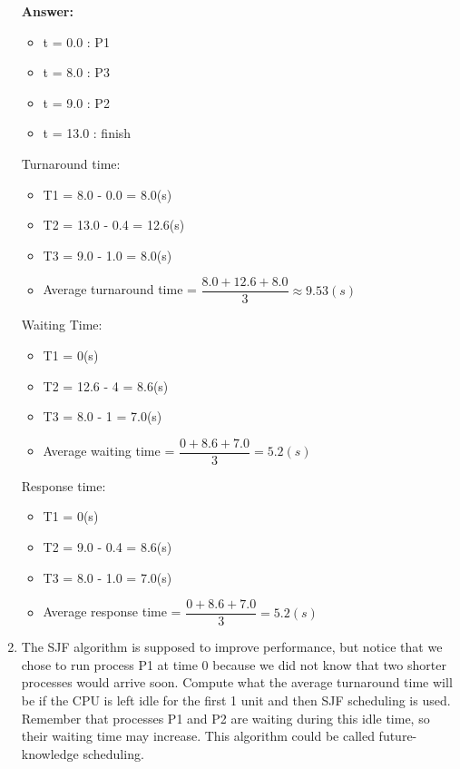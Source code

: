 \documentclass[a4paper]{article}
\newcommand{\tf}{\textbf}
\begin{document}
\begin{enumerate}[label=\alph*]
    \tf{Answer: } \\
    \begin{itemize}
        \item t = 0.0 : P1
        \item t = 8.0 : P3
        \item t = 9.0 : P2
        \item t = 13.0 : finish
    \end{itemize}

    \par{Turnaround time: } \\
    \begin{itemize}
        \item T1 = 8.0 - 0.0 = 8.0(s)
        \item T2 = 13.0 - 0.4 = 12.6(s)
        \item T3 = 9.0 - 1.0 = 8.0(s)
        \item Average turnaround time = $\dfrac{8.0 + 12.6 + 8.0}{3} \approx 9.53(s)$
    \end{itemize}

    \par{Waiting Time: } \\
    \begin{itemize}
        \item T1 = 0(s)
        \item T2 = 12.6 - 4 = 8.6(s)
        \item T3 = 8.0 - 1 = 7.0(s)
        \item Average waiting time = $\dfrac{0 + 8.6 + 7.0}{3} = 5.2(s)$
    \end{itemize}

    \par{Response time: }
    \begin{itemize}
        \item T1 = 0(s)
        \item T2 = 9.0 - 0.4 = 8.6(s)
        \item T3 = 8.0 - 1.0 = 7.0(s)
        \item Average response time = $\dfrac{0 + 8.6 + 7.0}{3} = 5.2(s)$
    \end{itemize}
    \item  The SJF algorithm is supposed to improve performance, but notice that we chose to run process P1 at time 0 because we did not know that two shorter processes would arrive soon. Compute what the average turnaround time will be if the CPU is left idle for the first 1 unit and then SJF scheduling is used. Remember that processes P1 and P2 are waiting during this idle time, so their waiting time may increase. This algorithm could be called future-knowledge scheduling. \\
    

\end{enumerate}
\end{document}
